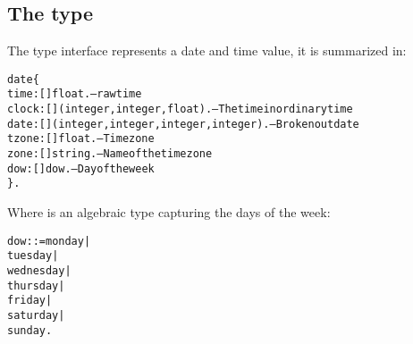 \subsection{The  type}
\label{date:date}
The  type interface represents a date and time value, it is summarized in:
\begin{alltt}
date \impl \{
  time:[]\funarrow{}float.                      -- raw time
  clock:[]\funarrow{}(integer,integer,float). -- The time in ordinary time
  date:[]\funarrow{}(integer,integer,integer,integer). -- Broken out date
  tzone:[]\funarrow{}float.   -- Time zone
  zone:[]\funarrow{}string.   -- Name of the time zone
  dow:[]\funarrow{}dow.       -- Day of the week
\}.
\end{alltt}
Where  is an algebraic type capturing the days of the week:
\begin{alltt}
  dow ::= monday | 
  tuesday | 
  wednesday | 
  thursday |
  friday |
  saturday |
  sunday.
\end{alltt}

